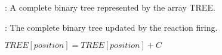 \begin{algorithm}[H]
\DontPrintSemicolon
{}

\caption{\protect{}}
\label{algo:update-tree}

\Input: A complete binary tree represented by the array TREE.\;

\Output: The complete binary tree updated by the reaction firing.\;

$TREE[position] = TREE[position] + C$\;

\end{algorithm}
